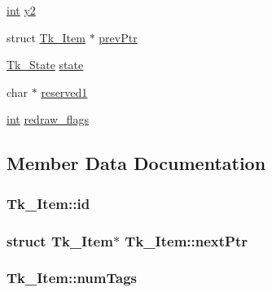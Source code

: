 \begin{DoxyCompactItemize}
\hyperlink{tk_8h_a83f82f76e7fed06f4c49d2db94028a6d}{int} \hyperlink{struct_tk___item_a5b7fb153dc7ecb1f394e2f5192884865}{y2}
\item 
struct \hyperlink{struct_tk___item}{Tk\+\_\+\+Item} $\ast$ \hyperlink{struct_tk___item_aa91f5c8c1644698bcc325fe341f6eb4b}{prev\+Ptr}
\item 
\hyperlink{tk_8h_ac421715315b3e7514bb0e174e7b96f36}{Tk\+\_\+\+State} \hyperlink{struct_tk___item_a7849c5f06a0c1906be9d01d5a541041e}{state}
\item 
char $\ast$ \hyperlink{struct_tk___item_a60db64f7b86f16c19861f9ac5c6b4a41}{reserved1}
\item 
\hyperlink{tk_8h_a83f82f76e7fed06f4c49d2db94028a6d}{int} \hyperlink{struct_tk___item_a50941534e2fba5830217ee44f25dc799}{redraw\+\_\+flags}
\end{DoxyCompactItemize}


\subsection{Member Data Documentation}
\subsubsection[{\texorpdfstring{id}{id}}]{ Tk\+\_\+\+Item\+::id}\hypertarget{struct_tk___item_a3975709657bbd095e05b41e8b0cc1cf2}{}\label{struct_tk___item_a3975709657bbd095e05b41e8b0cc1cf2}
\subsubsection[{\texorpdfstring{next\+Ptr}{nextPtr}}]{\setlength{\rightskip}{0pt plus 5cm}struct {\bf Tk\+\_\+\+Item}$\ast$ Tk\+\_\+\+Item\+::next\+Ptr}\hypertarget{struct_tk___item_a6c418b231340a944319106b60a4b2b04}{}\label{struct_tk___item_a6c418b231340a944319106b60a4b2b04}
\subsubsection[{\texorpdfstring{num\+Tags}{numTags}}]{ Tk\+\_\+\+Item\+::num\+Tags}\hypertarget{struct_tk___item_aae8bc2476c4906d39b0c0898ba7b3cca}{}\label{struct_tk___item_aae8bc2476c4906d39b0c0898ba7b3cca}
